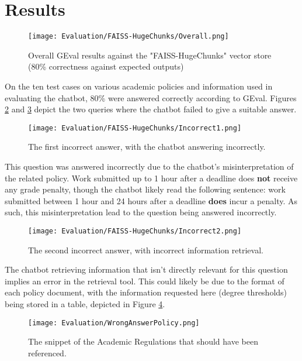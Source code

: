 \section{Results}

\begin{figure}[H]
    \centering
    \texttt{[image: Evaluation/FAISS-HugeChunks/Overall.png]}
    \caption{Overall GEval results against the "FAISS-HugeChunks" vector store (80\% correctness against expected outputs) \label{fig:EvalResults}}
\end{figure}

\noindent On the ten test cases on various academic policies and information used in evaluating the chatbot,
80\% were answered correctly according to GEval. Figures \ref{fig:WrongAnswer1} and \ref{fig:WrongAnswer2} depict 
the two queries where the chatbot failed to give a suitable answer.

\begin{figure}[H]
    \centering
    \texttt{[image: Evaluation/FAISS-HugeChunks/Incorrect1.png]}
    \caption{The first incorrect answer, with the chatbot answering incorrectly. \label{fig:WrongAnswer1}}
\end{figure}

\noindent This question was answered incorrectly due to the chatbot's misinterpretation of the related policy. Work submitted up to 
1 hour after a deadline does \textbf{not} receive any grade penalty, though the chatbot likely read the following sentence: work submitted between 1 hour and 
24 hours after a deadline \textbf{does} incur a penalty. As such, this misinterpretation lead to the question being answered incorrectly.

\begin{figure}[H]
    \centering
    \texttt{[image: Evaluation/FAISS-HugeChunks/Incorrect2.png]}
    \caption{The second incorrect answer, with incorrect information retrieval. \label{fig:WrongAnswer2}}
\end{figure}

\noindent The chatbot retrieving information that isn't directly relevant for this question implies an error in the retrieval tool. 
This could likely be due to the format of each policy document, with the information requested here (degree thresholds) being stored in
a table, depicted in Figure \ref{fig:WrongAnswer2Snippet}.

\begin{figure}[H]
    \centering
    \texttt{[image: Evaluation/WrongAnswerPolicy.png]}
    \caption{The snippet of the Academic Regulations that should have been referenced. \autocite{bcuPoliciesProcedures} \label{fig:WrongAnswer2Snippet}}
\end{figure}

